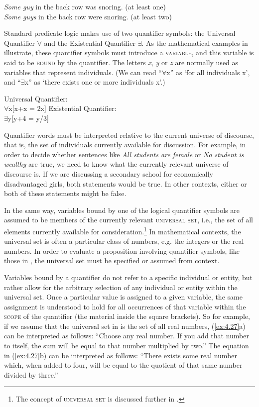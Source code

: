 \ea \label{ex:4.26}
\ea \textit{Some guy} in the back row was snoring.  (at least one)\\
\ex \textit{Some guys} in the back row were snoring.  (at least two)
                       \z
\z

Standard predicate logic makes use of two quantifier symbols: the Universal Quantifier ${\forall}$ and the Existential Quantifier ${\exists}$. As the mathematical examples in  illustrate, these quantifier symbols must introduce a \textsc{variable}, and this variable is said to be \textsc{bound} by the quantifier. The letters \textit{x}, \textit{y} or \textit{z} are normally used as variables that represent individuals. (We can read “${\forall}$x” as ‘for all individuals x’, and “${\exists}$x” as ‘there exists one or more individuals x’.) 

\ea \label{ex:4.27}
\ea  Universal Quantifier:\\
${\forall}$x[x+x = 2x]
\ex  Existential Quantifier:\\
${\exists}$y[y+4 = y/3]
\z \z

Quantifier words must be interpreted relative to the current universe of discourse, that is, the set of individuals currently available for discussion. For example, in order to decide whether sentences like \textit{All students are female} or \textit{No student is wealthy} are true, we need to know what the currently relevant universe of discourse is. If we are discussing a secondary school for economically disadvantaged girls, both statements would be true. In other contexts, either or both of these statements might be false.


In the same way, variables bound by one of the logical quantifier symbols are assumed to be members of the currently relevant \textsc{universal set}, i.e., the set of all elements currently available for consideration.\footnote{The concept of \textsc{universal set} is discussed further in .} In mathematical contexts, the universal set is often a particular class of numbers, e.g. the integers or the real numbers. In order to evaluate a proposition involving quantifier symbols, like those in , the universal set must be specified or assumed from context.



Variables bound by a quantifier do not refer to a specific individual or entity, but rather allow for the arbitrary selection of any individual or entity within the universal set. Once a particular value is assigned to a given variable, the same assignment is understood to hold for all occurrences of that variable within the \textsc{scope} of the quantifier (the material inside the square brackets). So for example, if we assume that the universal set in  is the set of all real numbers, (\ref{ex:4.27}a) can be interpreted as follows: “Choose any real number. If you add that number to itself, the sum will be equal to that number multiplied by two.” The equation in (\ref{ex:4.27}b) can be interpreted as follows: “There exists some real number which, when added to four, will be equal to the quotient of that same number divided by three.”



